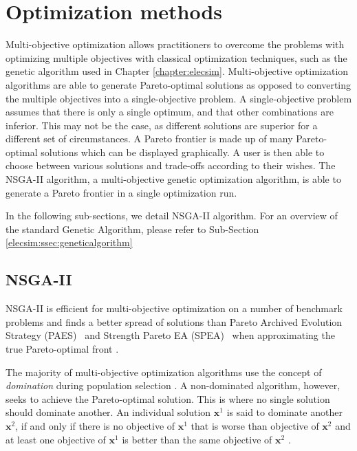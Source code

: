 \section{Optimization methods}
\label{carbonoptim:sec:optimisation}

Multi-objective optimization allows practitioners to overcome the problems with optimizing multiple objectives with classical optimization techniques, such as the genetic algorithm used in Chapter \ref{chapter:elecsim}. Multi-objective optimization algorithms are able to generate Pareto-optimal solutions as opposed to converting the multiple objectives into a single-objective problem. A single-objective problem assumes that there is only a single optimum, and that other combinations are inferior. This may not be the case, as different solutions are superior for a different set of circumstances. A Pareto frontier is made up of many Pareto-optimal solutions which can be displayed graphically. A user is then able to choose between various solutions and trade-offs according to their wishes. The NSGA-II algorithm, a multi-objective genetic optimization algorithm, is able to generate a Pareto frontier in a single optimization run. 

In the following sub-sections, we detail NSGA-II algorithm. For an overview of the standard Genetic Algorithm, please refer to Sub-Section \ref{elecsim:ssec:geneticalgorithm}



\subsection{NSGA-II}


NSGA-II is efficient for multi-objective optimization on a number of benchmark problems and finds a better spread of solutions than Pareto Archived Evolution Strategy (PAES)~\cite{Knowles1999} and Strength Pareto EA (SPEA)~\cite{Zitzler2006} when approximating the true Pareto-optimal front \cite{Valkanas2014}.

The majority of multi-objective optimization algorithms use the concept of \emph{domination} during population selection \cite{Burke2014}. A non-dominated algorithm, however, seeks to achieve the Pareto-optimal solution. This is where no single solution should dominate another. An individual solution $\mathbf{x}^{1}$ is said to dominate another $\mathbf{x}^{2}$, if and only if there is no objective of $\mathbf{x}^{1}$ that is worse than objective of $\mathbf{x}^{2}$ and at least one objective of $\mathbf{x}^{1}$ is better than the same objective of $\mathbf{x}^{2}$ \cite{Bao2017}. 


